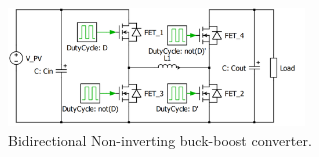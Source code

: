 \begin{figure}[htbp]
	\begin{center}
	\includegraphics[width=0.7\textwidth]{../Pictures/BID_H_B_BB}
	\caption{Bidirectional Non-inverting buck-boost converter.}
	\label{BID_N_INV_BB_SCHEMATIC}
	\end{center}
\end{figure}



